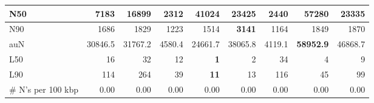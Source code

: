\documentclass[12pt,a4paper]{article}
\begin{document}
\begin{table}[ht]
\begin{center}
\begin{tabular}{|l*{8}{|r}|}
N50 & 7183 & 16899 & 2312 & 41024 & 23425 & 2440 & {\bf 57280} & 23335 \\ \hline
N90 & 1686 & 1829 & 1223 & 1514 & {\bf 3141} & 1164 & 1849 & 1870 \\ \hline
auN & 30846.5 & 31767.2 & 4580.4 & 24661.7 & 38065.8 & 4119.1 & {\bf 58952.9} & 46868.7 \\ \hline
L50 & 16 & 32 & 12 & {\bf 1} & 2 & 34 & 4 & 9 \\ \hline
L90 & 114 & 264 & 39 & {\bf 11} & 13 & 116 & 45 & 99 \\ \hline
\# N's per 100 kbp & 0.00 & 0.00 & 0.00 & 0.00 & 0.00 & 0.00 & 0.00 & 0.00 \\ \hline
\end{tabular}
\end{center}
\end{table}
\end{document}
